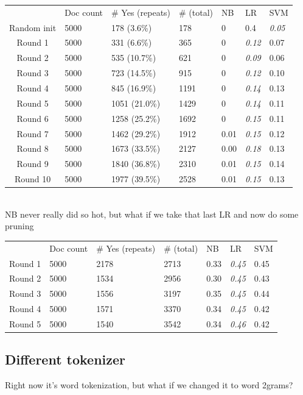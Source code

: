 \documentclass[11pt]{article} %
\begin{document}
\begin{tabular}{|c|*{6}{l|}}
\rowcolor{gray!50} & Doc count & \# Yes (repeats) & \# (total) & NB & LR & SVM \\
Random init & 5000 & 178 (3.6\%) & 178 & 0 & 0.4 & \emph{0.05} \\
Round 1 & 5000 & 331 (6.6\%) & 365 & 0 & \emph{0.12} & 0.07 \\
Round 2 & 5000 & 535 (10.7\%) & 621 & 0 & \emph{0.09} & 0.06 \\
Round 3 & 5000 & 723 (14.5\%) & 915 & 0 & \emph{0.12} & 0.10 \\
Round 4 & 5000 & 845 (16.9\%) & 1191 & 0 & \emph{0.14}& 0.13\\
Round 5 & 5000 & 1051 (21.0\%) & 1429 & 0 & \emph{0.14} & 0.11\\
Round 6 & 5000 & 1258 (25.2\%) & 1692 & 0 & \emph{0.15} & 0.11\\
Round 7 & 5000 & 1462 (29.2\%) & 1912 & 0.01 & \emph{0.15} & 0.12\\
Round 8 & 5000 & 1673 (33.5\%) & 2127 & 0.00 & \emph{0.18} & 0.13\\
Round 9 & 5000 & 1840 (36.8\%) & 2310 & 0.01 & \emph{0.15} & 0.14\\
Round 10 & 5000 & 1977 (39.5\%) & 2528 & 0.01 & \emph{0.15} & 0.13 \\
\end{tabular}\\
NB never really did so hot, but what if we take that last LR and now do some pruning\\
\begin{tabular}{|c|*{6}{l}}
\rowcolor{gray!50} & Doc count & \# Yes (repeats) & \# (total) & NB & LR & SVM \\
Round 1 & 5000 & 2178 & 2713 & 0.33 & \emph{0.45} & 0.45 \\
Round 2 & 5000 & 1534 & 2956 & 0.30 & \emph{0.45} & 0.43 \\
Round 3 & 5000 & 1556 & 3197 & 0.35 & \emph{0.45} & 0.44 \\
Round 4 & 5000 & 1571 & 3370 & 0.34 & \emph{0.45} & 0.42 \\
Round 5 & 5000 & 1540 & 3542 & 0.34 & \emph{0.46} & 0.42
\end{tabular}


\subsection{Different tokenizer}
Right now it's word tokenization, but what if we changed it to word 2grams? \\
\end{document}
